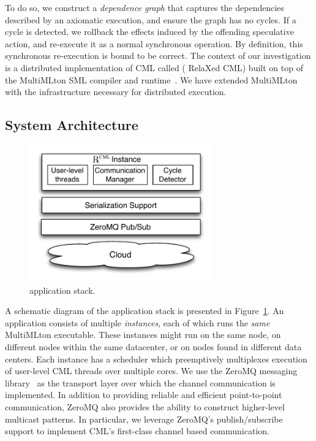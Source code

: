 To do so, we construct a \emph{dependence graph} that captures the dependencies
described by an axiomatic execution, and ensure the graph has no cycles. If a
cycle is detected, we rollback the effects induced by the offending speculative
action, and re-execute it as a normal synchronous operation. By definition,
this synchronous re-execution is bound to be correct. The context of our
investigation is a distributed implementation of CML called \rxcml ({\sc
RelaXed CML}) built on top of the MultiMLton SML compiler and
runtime~\cite{JFP14}. We have extended MultiMLton with the infrastructure
necessary for distributed execution.

\subsection {System Architecture}

\begin{figure}[t]
\centering
\includegraphics[width=0.7\textwidth]{Figures/CRexDesign}
\caption{\rxcml application stack.}
\label{fig:c-rex}
\end{figure}

A schematic diagram of the \rxcml application stack is presented in
Figure~\ref{fig:c-rex}. An \rxcml application consists of multiple
\emph{instances}, each of which runs the \emph{same} MultiMLton executable.
These instances might run on the same node, on different nodes within the same
datacenter, or on nodes found in different data centers. Each instance has a
scheduler which preemptively multiplexes execution of user-level CML threads
over multiple cores. We use the ZeroMQ messaging library~\cite{zeromq} as the
transport layer over which the \rxcml channel communication is implemented. In
addition to providing reliable and efficient point-to-point communication,
ZeroMQ also provides the ability to construct higher-level multicast patterns.
In particular, we leverage ZeroMQ's publish/subscribe support to implement
CML's first-class channel based communication.

